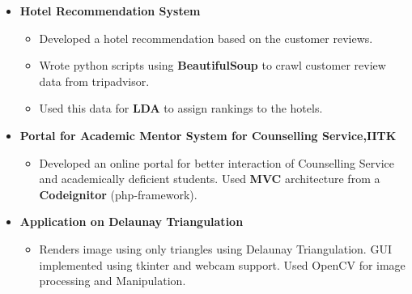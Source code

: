 \documentclass[a4paper]{article}
\begin{document}
\begin{itemize}
    \item
    \textbf{Hotel Recommendation System}
	   \begin{itemize}
      \setlength\itemsep{-1em}
	    \item Developed a hotel recommendation based on the customer reviews.\\
        \item Wrote python scripts using \textbf{BeautifulSoup} to crawl customer review data from tripadvisor.\\
        \item Used this data for \textbf{LDA} to assign rankings to the hotels.\\
	   \end{itemize}
    \item
\vspace{3mm}
    \textbf{Portal for Academic Mentor System for Counselling Service,IITK}
	   \begin{itemize}
	    \item Developed an online portal for better interaction of Counselling 
            Service and academically deficient students. Used \textbf{MVC} architecture 
            from a \textbf{Codeignitor} (php-framework).
	   \end{itemize}
    \item
      \textbf{Application on Delaunay  Triangulation}
	\begin{itemize}
	 \item Renders image using only triangles using Delaunay Triangulation. GUI implemented using tkinter
         and webcam support. Used OpenCV for image processing and Manipulation.
	\end{itemize}
  \end{itemize}

\end{document}
